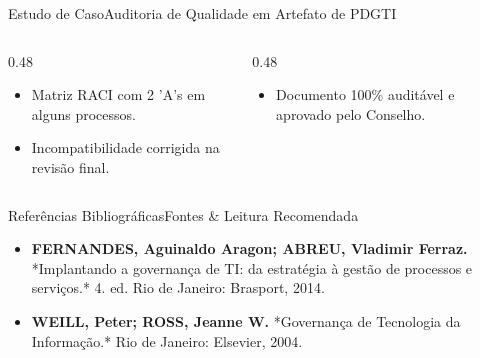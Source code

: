 \begin{senaiframe}{Estudo de Caso}{Auditoria de Qualidade em Artefato de PDGTI}
  \begin{columns}[t]
    \begin{column}{0.48\textwidth}
      \begin{tcolorbox}[senairedcard, title={Falha de Auditoria}]
        \begin{itemize}
          \item Matriz RACI com 2 'A's em alguns processos.
          \item Incompatibilidade corrigida na revisão final.
        \end{itemize}
      \end{tcolorbox}
    \end{column}
    \begin{column}{0.48\textwidth}
      \begin{tcolorbox}[senaigreencard, title={Aprovação Executiva}]
        \begin{itemize}
          \item Documento 100\% auditável e aprovado pelo Conselho.
        \end{itemize}
      \end{tcolorbox}
    \end{column}
  \end{columns}
\end{senaiframe}

\begin{senaiframe}{Referências Bibliográficas}{Fontes \& Leitura Recomendada}
  \vspace{0.5cm}
  \begin{tcolorbox}[senaicard, title={Obras de Referência}]
    \begin{itemize}
      \item \textbf{FERNANDES, Aguinaldo Aragon; ABREU, Vladimir Ferraz.} *Implantando a governança de TI: da estratégia à gestão de processos e serviços.* 4. ed. Rio de Janeiro: Brasport, 2014.
      \item \textbf{WEILL, Peter; ROSS, Jeanne W.} *Governança de Tecnologia da Informação.* Rio de Janeiro: Elsevier, 2004.
    \end{itemize}
  \end{tcolorbox}
\end{senaiframe}

